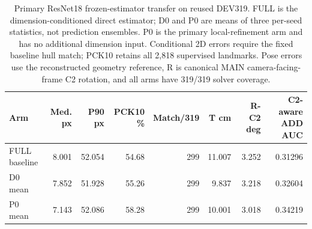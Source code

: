\begin{table}[t]\centering\small
\caption{Primary ResNet18 frozen-estimator transfer on reused DEV319. FULL is the dimension-conditioned direct estimator; D0 and P0 are means of three per-seed statistics, not prediction ensembles. P0 is the primary local-refinement arm and has no additional dimension input. Conditional 2D errors require the fixed baseline hull match; PCK10 retains all 2,818 supervised landmarks. Pose errors use the reconstructed geometry reference, R is canonical MAIN camera-facing-frame C2 rotation, and all arms have 319/319 solver coverage.}\label{tab:resnet}
\begin{tabular}{lrrrrrrr}\toprule
Arm & Med. px & P90 px & PCK10 \% & Match/319 & T cm & R-C2 deg & C2-aware ADD AUC\\\midrule
FULL baseline & 8.001 & 52.054 & 54.68 & 299 & 11.007 & 3.252 & 0.31296\\
D0 mean & 7.852 & 51.928 & 55.26 & 299 & 9.837 & 3.218 & 0.32604\\
P0 mean & 7.143 & 52.086 & 58.28 & 299 & 10.001 & 3.018 & 0.34219\\
\bottomrule\end{tabular}
\end{table}
